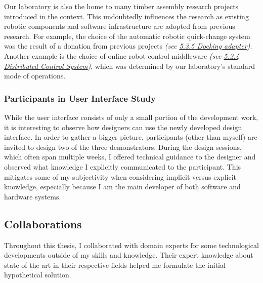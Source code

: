 \documentclass[11pt]{book}
\begin{document}
Our laboratory is also the home to many timber assembly research projects introduced in the context. This undoubtedly influences the research as existing robotic components and software infrastructure are adopted from previous research. For example, the choice of the automatic robotic quick-change system was the result of a donation from previous projects \textit{(see \uline{5.3.5 Docking adapter})}. Another example is the choice of online robot control middleware \textit{(see \uline{5.2.4 Distributed Control System})}, which was determined by our laboratory's standard mode of operations.

\subsubsection{Participants in User Interface Study}

While the user interface consists of only a small portion of the development work, it is interesting to observe how designers can use the newly developed design interface. In order to gather a bigger picture, participants (other than myself) are invited to design two of the three demonstrators. During the design sessions, which often span multiple weeks, I offered technical guidance to the designer and observed what knowledge I explicitly communicated to the participant. This mitigates some of my subjectivity when considering implicit versus explicit knowledge, especially because I am the main developer of both software and hardware systems. 

\subsection{Collaborations}

Throughout this thesis, I collaborated with domain experts for some technological developments outside of my skills and knowledge. Their expert knowledge about state of the art in their respective fields helped me formulate the initial hypothetical solution. 
\end{document}
